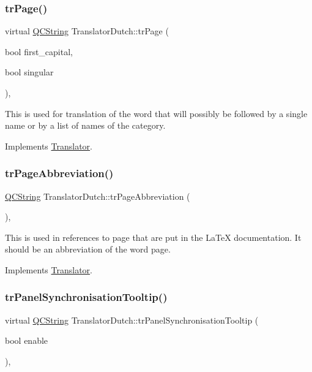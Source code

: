 \subsubsection{\texorpdfstring{trPage()}{trPage()}}
{\footnotesize\ttfamily virtual \mbox{\hyperlink{class_q_c_string}{Q\+C\+String}} Translator\+Dutch\+::tr\+Page (\begin{DoxyParamCaption}\item[{bool}]{first\+\_\+capital,  }\item[{bool}]{singular }\end{DoxyParamCaption})\hspace{0.3cm}{\ttfamily [inline]}, {\ttfamily [virtual]}}

This is used for translation of the word that will possibly be followed by a single name or by a list of names of the category. 

Implements \mbox{\hyperlink{class_translator}{Translator}}.

\mbox{\label{class_translator_dutch_abb872f2d56775594b66e583cfc78f2f2}} 
\subsubsection{\texorpdfstring{trPageAbbreviation()}{trPageAbbreviation()}}
{\footnotesize\ttfamily \mbox{\hyperlink{class_q_c_string}{Q\+C\+String}} Translator\+Dutch\+::tr\+Page\+Abbreviation (\begin{DoxyParamCaption}{ }\end{DoxyParamCaption})\hspace{0.3cm}{\ttfamily [inline]}, {\ttfamily [virtual]}}

This is used in references to page that are put in the La\+TeX documentation. It should be an abbreviation of the word page. 

Implements \mbox{\hyperlink{class_translator}{Translator}}.

\mbox{\label{class_translator_dutch_a491405ec8591e8b7b193ced27969d4d4}} 
\subsubsection{\texorpdfstring{trPanelSynchronisationTooltip()}{trPanelSynchronisationTooltip()}}
{\footnotesize\ttfamily virtual \mbox{\hyperlink{class_q_c_string}{Q\+C\+String}} Translator\+Dutch\+::tr\+Panel\+Synchronisation\+Tooltip (\begin{DoxyParamCaption}\item[{bool}]{enable }\end{DoxyParamCaption})\hspace{0.3cm}{\ttfamily [inline]}, {\ttfamily [virtual]}}

